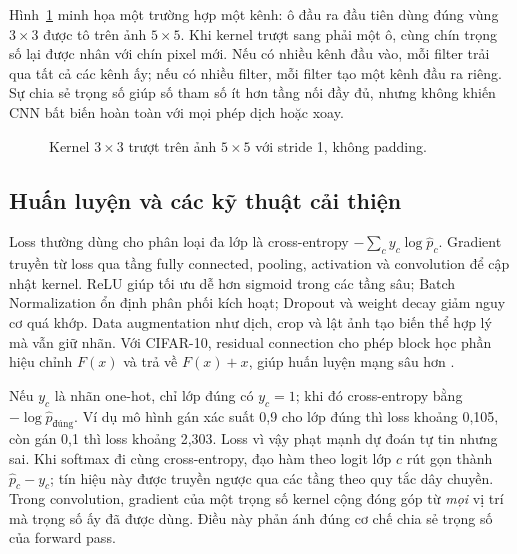 \documentclass[12pt,a4paper]{report}
\begin{document}
Hình~\ref{fig:essay03-convolution} minh họa một trường hợp một kênh: ô đầu ra đầu tiên dùng đúng vùng $3\times3$ được tô trên ảnh $5\times5$. Khi kernel trượt sang phải một ô, cùng chín trọng số lại được nhân với chín pixel mới. Nếu có nhiều kênh đầu vào, mỗi filter trải qua tất cả các kênh ấy; nếu có nhiều filter, mỗi filter tạo một kênh đầu ra riêng. Sự chia sẻ trọng số giúp số tham số ít hơn tầng nối đầy đủ, nhưng không khiến CNN bất biến hoàn toàn với mọi phép dịch hoặc xoay.
\begin{figure}[htbp]\centering
{}
\caption{Kernel $3\times3$ trượt trên ảnh $5\times5$ với stride 1, không padding.}\label{fig:essay03-convolution}
\end{figure}

\subsection{Huấn luyện và các kỹ thuật cải thiện}
Loss thường dùng cho phân loại đa lớp là cross-entropy $-\sum_c y_c\log\hat p_c$. Gradient truyền từ loss qua tầng fully connected, pooling, activation và convolution để cập nhật kernel. ReLU giúp tối ưu dễ hơn sigmoid trong các tầng sâu; Batch Normalization ổn định phân phối kích hoạt; Dropout và weight decay giảm nguy cơ quá khớp. Data augmentation như dịch, crop và lật ảnh tạo biến thể hợp lý mà vẫn giữ nhãn. Với CIFAR-10, residual connection cho phép block học phần hiệu chỉnh $F(x)$ và trả về $F(x)+x$, giúp huấn luyện mạng sâu hơn \cite{resnet2016}.

Nếu $y_c$ là nhãn one-hot, chỉ lớp đúng có $y_c=1$; khi đó cross-entropy bằng $-\log\hat p_{\mathrm{đúng}}$. Ví dụ mô hình gán xác suất 0,9 cho lớp đúng thì loss khoảng 0,105, còn gán 0,1 thì loss khoảng 2,303. Loss vì vậy phạt mạnh dự đoán tự tin nhưng sai. Khi softmax đi cùng cross-entropy, đạo hàm theo logit lớp $c$ rút gọn thành $\hat p_c-y_c$; tín hiệu này được truyền ngược qua các tầng theo quy tắc dây chuyền. Trong convolution, gradient của một trọng số kernel cộng đóng góp từ \emph{mọi} vị trí mà trọng số ấy đã được dùng. Điều này phản ánh đúng cơ chế chia sẻ trọng số của forward pass.
\end{document}
